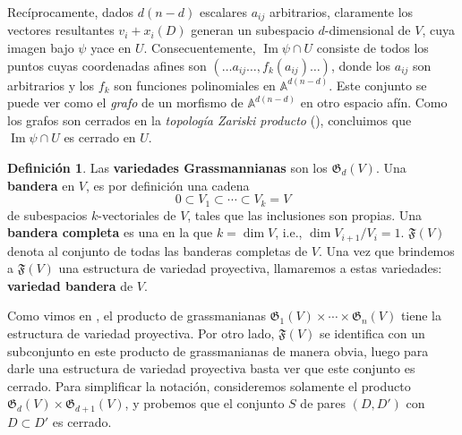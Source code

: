 \documentclass[spanish,10pt]{amsart}
\theoremstyle{definition}
\newtheorem{definition}[theorem]{Definición}
\theoremstyle{remark}
\numberwithin{equation}{section}
\newcommand{\afine}[1]{\mathbb{A}^{#1}}
\newcommand{\Imagen}{\operatorname{Im}}
\begin{document}
Recíprocamente, dados $d (n-d)$ escalares $a_{ij}$ arbitrarios, claramente los vectores resultantes $v_i + x_i (D)$ generan un subespacio $d$-dimensional de $V$, cuya imagen bajo $\psi$ yace en $U$. Consecuentemente, $\Imagen \psi \cap U$ consiste de todos los puntos cuyas coordenadas afines son $(\ldots a_{ij} \ldots, f_k (a_{ij}) \ldots)$, donde los $a_{ij}$ son arbitrarios y los $f_k$ son funciones polinomiales en $\afine {d (n-d)}$. Este conjunto se puede ver como el \textit{grafo} de un morfismo de $\afine{d (n-d)}$ en otro espacio afín. Como los grafos son cerrados en la \textit{topología Zariski producto} (\cite[Teorema 2.6.12]{notas_pedro}), concluimos que $\Imagen \psi \cap U$ es cerrado en $U$.

\begin{definition}
Las \textbf{variedades Grassmannianas} son los $\mathfrak G _d (V)$. Una \textbf{bandera} en $V$, es por definición una cadena
\[
    0 \subset V_1 \subset \cdots \subset V_k = V
\]
de subespacios $k$-vectoriales de $V$, tales que las inclusiones son propias. Una \textbf{bandera completa} es una en la que $k = \dim V$, i.e., $\dim V_{i+1}/V_i = 1$. $\mathfrak F (V)$ denota al conjunto de todas las banderas completas de $V$. Una vez que brindemos a $\mathfrak F (V)$ una estructura de variedad proyectiva, llamaremos a estas variedades: \textbf{variedad bandera} de $V$.
\end{definition}


Como vimos en \cite[Corolario 2.7.17]{notas_pedro}, el producto de grassmanianas $\mathfrak G_1 (V) \times \cdots \times \mathfrak G_n (V)$ tiene la estructura de variedad proyectiva. Por otro lado, $\mathfrak F (V)$ se identifica con un subconjunto en este producto de grassmanianas de manera obvia, luego para darle una estructura de variedad proyectiva basta ver que este conjunto es cerrado. Para simplificar la notación, consideremos solamente el producto $\mathfrak G _d (V) \times \mathfrak G_{d+1} (V)$, y probemos que el conjunto $S$ de pares $(D, D')$ con $D \subset D'$ es cerrado.
\end{document}
